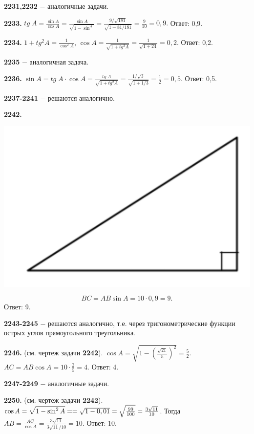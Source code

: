  \textbf{2231,2232} $-$ аналогичные задачи.
 
 \textbf{2233.} $tg\;A=\frac{\sin{A}}{\cos{A}}=\frac{\sin{A}}{\sqrt{1-\sin^{A}}} = \frac{9/\sqrt{181}}{\sqrt{1 - 81/181}}=\frac{9}{10}=0,9.$ \newline \null \hspace*{\fill} Ответ: 0,9.
 
 \textbf{2234.} $1 + tg^2A=\frac{1}{\cos^2{A}}$, $\cos{A} = \frac{1}{\sqrt{1+tg^2A}}=\frac{1}{\sqrt{1+24}} = 0,2.$ \newline \null \hspace*{\fill} Ответ: 0,2.
 
 \textbf{2235} $-$ аналогичная задача.
 
 \textbf{2236.} $\sin{A} = tg\; A\cdot \cos{A} = \frac{tg\;A}{\sqrt{1+tg^2A}}=\frac{1/\sqrt{3}}{\sqrt{1+1/3}}=\frac{1}{2}=0,5$. \newline \null \hspace*{\fill} Ответ: 0,5.
 
 \textbf{2237-2241} $-$ решаются аналогично.
 
 \clearpage
 \textbf{2242.}
 
 {\centering \includegraphics[width=0.4\linewidth]{Geometry/Content/51.png}
 	
 }
\[
BC=AB\sin{A}=10\cdot0,9=9.
\]
\null \hspace*{\fill} Ответ: 9.

\textbf{2243-2245} $-$ решаются аналогично, т.е. через тригонометрические функции острых углов прямоугольного треугольника.

\textbf{2246.} (см. чертеж задачи \textbf{2242}). $\cos{A} = \sqrt{1-\left( \frac{\sqrt{21}}{5} \right)^2} = \frac{5}{2}.$ $AC=AB\cos{A}=10\cdot\frac{2}{5}=4.$ \newline \null \hspace*{\fill} Ответ: 4.

\textbf{2247-2249} $-$ аналогичные задачи.

\textbf{2250.} (см. чертеж задачи \textbf{2242}). $\cos{A} = \sqrt{1-\sin^2{A}} = \linebreak= \sqrt{1-0,01}=\sqrt{\frac{99}{100}}=\frac{3\sqrt{11}}{10}$. Тогда $AB=\frac{AC}{\cos{A}}=\frac{3\sqrt{11}}{3\sqrt{11}/10}=10.$ \newline \null \hspace*{\fill} Ответ: 10.

